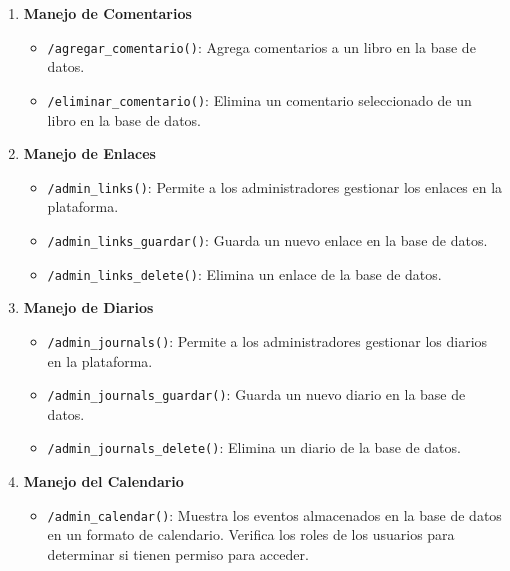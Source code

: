 \documentclass[a4paper, 12pt]{book}
\begin{document}
\begin{enumerate}
    \item \textbf{Manejo de Comentarios}
    \begin{itemize}
        \item \texttt{/agregar\_comentario()}: Agrega comentarios a un libro en la base de datos.
        \item \texttt{/eliminar\_comentario()}: Elimina un comentario seleccionado de un libro en la base de datos.
    \end{itemize}

    \item \textbf{Manejo de Enlaces}
    \begin{itemize}
        \item \texttt{/admin\_links()}: Permite a los administradores gestionar los enlaces en la plataforma.
        \item \texttt{/admin\_links\_guardar()}: Guarda un nuevo enlace en la base de datos.
        \item \texttt{/admin\_links\_delete()}: Elimina un enlace de la base de datos.
    \end{itemize}

    \item \textbf{Manejo de Diarios}
    \begin{itemize}
        \item \texttt{/admin\_journals()}: Permite a los administradores gestionar los diarios en la plataforma.
        \item \texttt{/admin\_journals\_guardar()}: Guarda un nuevo diario en la base de datos.
        \item \texttt{/admin\_journals\_delete()}: Elimina un diario de la base de datos.
    \end{itemize}

    \item \textbf{Manejo del Calendario}
    \begin{itemize}
        \item \texttt{/admin\_calendar()}: Muestra los eventos almacenados en la base de datos en un formato de calendario. Verifica los roles de los 
        usuarios para determinar si tienen permiso para acceder.
    \end{itemize}
\end{enumerate}
\end{document}
